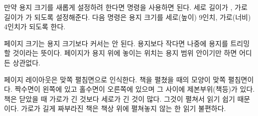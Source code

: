 만약 용지 크기를 새롭게 설정하려 한다면 \cmd{\setstocksize} 명령을
사용하면 된다. 세로 길이가 , 가로 길이가 가
되도록 설정해준다. 다음 명령은 용지 크기를 세로(높이) 9인치, 가로(너비) 4인치가 되도록 한다.
\begin{lcode}
\setstocksize{9in}{4in}
\end{lcode}

페이지 크기는 용지 크기보다 커서는 안 된다. 용지보다 작다면 나중에 용지를
트리밍할 것이라는 뜻이다. 페이지가 용지 위에 놓이는 위치는
용지 범위 안이기만 하면 어디든 상관없다.

페이지 레이아웃은 맞쪽 펼침면으로 인식한다.
책을 펼쳤을 때의 모양이 맞쪽 펼침면이다. 짝수면이 왼쪽에 있고 홀수면이 오른쪽에 있으며
그 사이에 제본부위(책등)가 있다. 
책은 닫았을 때 가로가 긴 것보다 세로가 긴 것이 많다. 그것이 펼쳐서 읽기 쉽기 때문이다. 가로가 길게 짜부라진 책은 책상 위에 펼쳐놓지 않는 한
읽기 불편하다.

